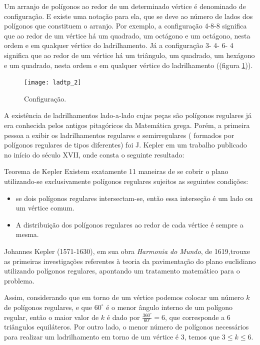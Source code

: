 Um arranjo de polígonos ao redor de um determinado vértice é denominado de configuração. E existe uma notação para ela, que se deve ao número de lados dos polígonos que constituem o arranjo. Por exemplo, a configuração 4-8-8 significa que ao redor de um vértice há um quadrado, um octágono e um octágono, nesta ordem e em qualquer vértice do ladrilhamento. Já a configuração 3- 4- 6- 4 significa que ao redor de um vértice há um triângulo, um quadrado, um hexágono e um quadrado, nesta ordem e em qualquer vértice do ladrilhamento ((figura \ref{lad_tp2})).


\begin{figure}[H]
\centering
\texttt{[image: ladtp\_2]}
\label{lad_tp2}
\caption{Configuração.}
\end{figure}

A existência de ladrilhamentos lado-a-lado cujas peças são polígonos regulares já era conhecida pelos antigos pitagóricos da Matemática grega. Porém, a primeira pessoa a exibir os ladrilhamentos regulares e semirregulares ( formados por polígonos regulares de tipos diferentes) foi J. Kepler em um trabalho publicado no início do século XVII, onde consta o seguinte resultado:

\begin{observation}{Teorema de Kepler}
Existem exatamente 11 maneiras de se cobrir o plano utilizando-se exclusivamente polígonos regulares sujeitos as seguintes condições:
\begin{itemize}
\item	se dois polígonos regulares intersectam-se, então essa interseção é um lado ou um vértice comum.
\item	A distribuição dos polígonos regulares ao redor de cada vértice é sempre a mesma.
\end{itemize}

\end{observation}



\begin{knowledge}
Johannes Kepler (1571-1630), em sua obra \textit{Harmonia do Mundo}, de 1619,trouxe as primeiras investigações referentes à teoria da pavimentação do plano euclidiano utilizando polígonos regulares, apontando um tratamento matemático para o problema.
\end{knowledge}




Assim, considerando que em torno de um vértice podemos colocar um número $k$ de polígonos regulares, e que $60^{\circ}$ é o menor ângulo interno de um polígono regular, então o maior valor de $k$ é dado por $\displaystyle \frac{360^{\circ}}{60^{\circ}} = 6$, que corresponde a 6 triângulos equiláteros. Por outro lado, o menor número de polígonos necessários para realizar um ladrilhamento em torno de um vértice é 3, temos que  $3\leq k \leq 6$.

